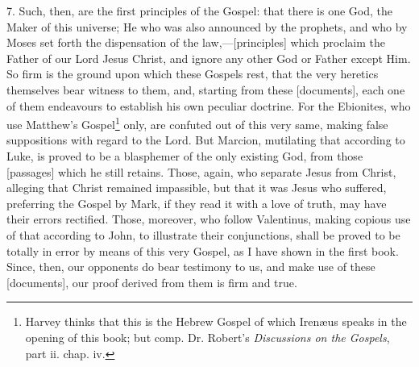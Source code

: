 7. Such, then, are the first principles of the Gospel: that there is one God, the Maker of this universe; He who was also announced by the prophets, and who by Moses set forth the dispensation of the law,—[principles] which proclaim the Father of our Lord Jesus Christ, and ignore any other God or Father except Him. So firm is the ground upon which these Gospels rest, that the very heretics themselves bear witness to them, and, starting from these [documents], each one of them endeavours to establish his own peculiar doctrine. For the Ebionites, who use Matthew’s Gospel\footnote{Harvey thinks that this is the Hebrew Gospel of which Irenæus speaks in the opening of this book; but comp. Dr. Robert’s \emph{Discussions on the Gospels}, part ii. chap. iv.} only, are confuted out of this very same, making false suppositions with regard to the Lord. But Marcion, mutilating that according to Luke, is proved to be a blasphemer of the only existing God, from those [passages] which he still retains. Those, again, who separate Jesus from Christ, alleging that Christ remained impassible, but that it was Jesus who suffered, preferring the Gospel by Mark, if they read it with a love of truth, may have their errors rectified. Those, moreover, who follow Valentinus, making copious use of that according to John, to illustrate their conjunctions, shall be proved to be totally in error by means of this very Gospel, as I have shown in the first book. Since, then, our opponents do bear testimony to us, and make use of these [documents], our proof derived from them is firm and true.

